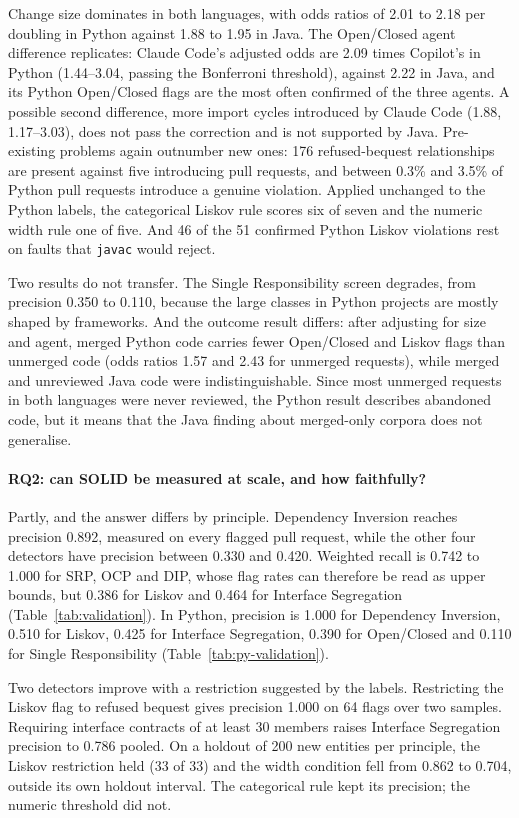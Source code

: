 Change size dominates in both languages, with odds ratios of 2.01 to 2.18 per doubling in Python
against 1.88 to 1.95 in Java. The Open/Closed agent difference replicates: Claude Code's adjusted
odds are 2.09 times Copilot's in Python (1.44--3.04, passing the Bonferroni threshold), against 2.22
in Java, and its Python Open/Closed flags are the most often confirmed of the three agents. A
possible second difference, more import cycles introduced by Claude Code (1.88, 1.17--3.03), does not
pass the correction and is not supported by Java. Pre-existing problems again outnumber new ones: 176
refused-bequest relationships are present against five introducing pull requests, and between 0.3\%
and 3.5\% of Python pull requests introduce a genuine violation. Applied unchanged to the Python
labels, the categorical Liskov rule scores six of seven and the numeric width rule one of five. And
46 of the 51 confirmed Python Liskov violations rest on faults that \texttt{javac} would reject.

Two results do not transfer. The Single Responsibility screen degrades, from precision 0.350 to
0.110, because the large classes in Python projects are mostly shaped by frameworks. And the outcome
result differs: after adjusting for size and agent, merged Python code carries fewer Open/Closed and
Liskov flags than unmerged code (odds ratios 1.57 and 2.43 for unmerged requests), while merged and
unreviewed Java code were indistinguishable. Since most unmerged requests in both languages were never
reviewed, the Python result describes abandoned code, but it means that the Java finding about
merged-only corpora does not generalise.

\paragraph{RQ2: can SOLID be measured at scale, and how faithfully?}
Partly, and the answer differs by principle. Dependency Inversion reaches precision 0.892, measured
on every flagged pull request, while the other four detectors have precision between 0.330 and
0.420. Weighted recall is 0.742 to 1.000 for SRP, OCP and DIP, whose flag rates can therefore be read
as upper bounds, but 0.386 for Liskov and 0.464 for Interface Segregation
(Table~\ref{tab:validation}). In Python, precision is 1.000 for Dependency Inversion, 0.510 for
Liskov, 0.425 for Interface Segregation, 0.390 for Open/Closed and 0.110 for Single Responsibility
(Table~\ref{tab:py-validation}).

Two detectors improve with a restriction suggested by the labels. Restricting the Liskov flag to
refused bequest gives precision 1.000 on 64 flags over two samples. Requiring interface contracts
of at least 30 members raises Interface Segregation precision to 0.786 pooled. On a holdout of 200
new entities per principle, the Liskov restriction held (33 of 33) and the width condition fell from
0.862 to 0.704, outside its own holdout interval. The categorical rule kept its precision; the
numeric threshold did not.


